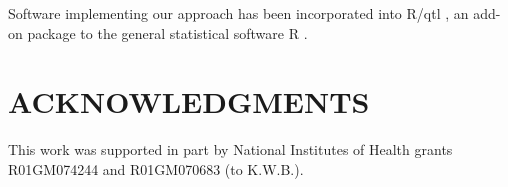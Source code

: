 \documentclass[12pt,letterpaper]{article}
\begin{document}
Software implementing our approach has been incorporated into
R/qtl \citep{Broman2003}, an add-on package
to the general statistical software R \citep{R}.

\section*{ACKNOWLEDGMENTS}

This work was supported in part by National Institutes of Health
grants R01GM074244 and R01GM070683 (to K.W.B.).


\clearpage

\renewcommand*{\refname}{LITERATURE CITED}




\clearpage

\end{document}
